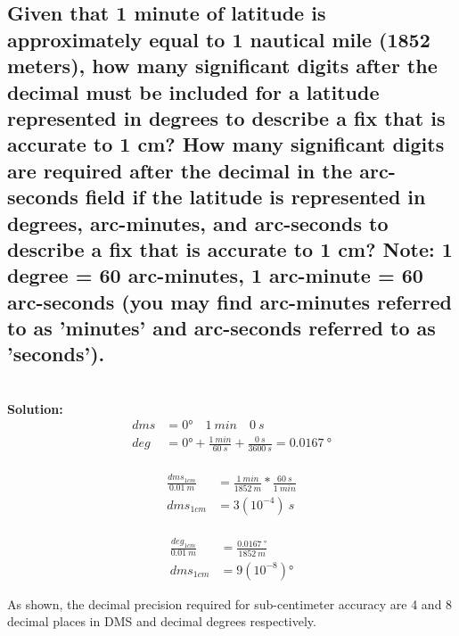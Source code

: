 \documentclass[12pt]{article}
\newcommand{\solution}{\textbf{\\Solution: \\}}
\begin{document}
  \subsection
  {
    Given that 1 minute of latitude is approximately equal 
    to 1 nautical mile (1852 meters), how many significant digits after the 
    decimal must be included for a latitude represented in degrees to 
    describe a fix that is accurate to 1 cm? How many significant digits are 
    required after the decimal in the arc-seconds field if the latitude is 
    represented in degrees, arc-minutes, and arc-seconds to describe a fix 
    that is accurate to 1 cm? Note: 1 degree = 60 arc-minutes, 1 arc-minute = 
    60 arc-seconds (you may find arc-minutes referred to as
    'minutes' and arc-seconds referred to as 'seconds').
  } 
  \begin{adjustwidth}{10mm}{0mm}
    \solution
    \begin{equation}
      \begin{split}
        dms &= 0 \si{\degree}\quad 1 \:\si{min}\quad 0 \:\si{s} \\
        deg &= 0 \si{\degree} 
                    + \frac{1 \:\si{min}}{60 \:\si{s}}
                    + \frac{0 \:\si{s}}{3600 \:\si{s}}
                    = 0.0167 \:\si{\degree}
      \end{split}
    \end{equation}
    \\
    \begin{equation}
      \begin{split}
        \frac{dms_{1cm}}{0.01 \:\si{m}} &= 
                              \frac{1 \:\si{min}}{1852 \:\si{m}} * 
                              \frac{60 \:\si{s}}{1 \:\si{min}} \\
        dms_{1cm} &= 3(10^{-4}) \:\si{s}
      \end{split}
    \end{equation}
    \\
    \begin{equation}
      \begin{split}
        \frac{deg_{1cm}}{0.01 \:\si{m}} &= 
                              \frac{0.0167 \:\si{\degree}}{1852 \:\si{m}} \\
        dms_{1cm} &= 9(10^{-8}) \si{\degree}
      \end{split}
    \end{equation}

    As shown, the decimal precision required for sub-centimeter accuracy are 4 and 
    8 decimal places in DMS and decimal degrees respectively.
  \end{adjustwidth}
\end{document}

